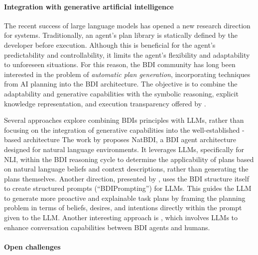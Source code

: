 \paragraph{Integration with generative artificial intelligence}

The recent success of large language models has opened a new research direction for  systems. Traditionally, an agent's plan library is statically defined by the developer before execution. 
%
Although this is beneficial for the agent's predictability and controllability,
it limits the agent's flexibility and adaptability to unforeseen situations.
%
For this reason,
the \ac{BDI} community has long been interested in the problem of \emph{automatic plan generation},
incorporating techniques from \ac{AI} planning into the \ac{BDI} architecture.
%
The objective is to combine the adaptability and generative capabilities with the symbolic reasoning, 
explicit knowledge representation, 
and execution transparency offered by \agentspeak{}. 

Several approaches explore combining \acp{BDI} principles with \acp{LLM},
rather than focusing on the integration of generative capabilities
into the well-established \agentspeak{}-based architecture
%
The work by \cite{IchidaM024} proposes NatBDI,
a \ac{BDI} agent architecture designed for natural language environments.
%
It leverages \acp{LLM},
specifically for \ac{NLI},
within the \ac{BDI} reasoning cycle to determine the applicability of plans based on natural language beliefs and context descriptions,
rather than generating the plans themselves.
%
Another direction, presented by \cite{JangYCO023},
uses the \ac{BDI} structure itself to create structured prompts (``BDIPrompting'') for \acp{LLM}.
%
This guides the \ac{LLM} to generate more proactive and explainable task plans
by framing the planning problem in terms of beliefs, desires, and intentions
directly within the prompt given to the \ac{LLM}.
%
Another interesting approach is \cite{2025chatbdi},
which involves \acp{LLM} to enhance conversation capabilities between \ac{BDI} agents and humans.

\paragraph{Open challenges}

